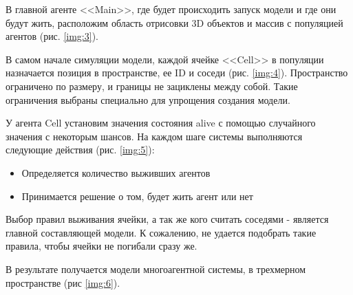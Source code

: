 


В главной агенте <<Main>>, где будет происходить запуск модели и где они будут жить, расположим область отрисовки 3D объектов и массив с популяцией агентов (рис. \ref{img:3}).

В самом начале симуляции модели, каждой ячейке <<Cell>> в популяции назначается позиция в пространстве, ее ID и соседи (рис. \ref{img:4}).
Пространство ограничено по размеру, и границы не зациклены между собой.
Такие ограничения выбраны специально для упрощения создания модели.

У агента Cell установим значения состояния alive с помощью случайного значения с некоторым шансов.
На каждом шаге системы выполняются следующие действия (рис. \ref{img:5}):
\begin{itemize}
    \item Определяется количество выживших агентов
    \item Принимается решение о том, будет жить агент или нет
\end{itemize}



Выбор правил выживания ячейки, а так же кого считать соседями - является главной составляющей модели. 
К сожалению, не удается подобрать такие правила, чтобы ячейки не погибали сразу же.

В результате получается модели многоагентной системы, в трехмерном пространстве (рис \ref{img:6}).


\clearpage

